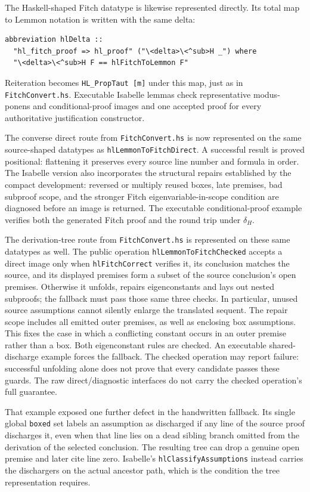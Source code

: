 \documentclass[11pt]{article}
\theoremstyle{plain}
\theoremstyle{definition}
\theoremstyle{remark}
\begin{document}
The Haskell-shaped Fitch datatype is likewise represented directly. Its total
map to Lemmon notation is written with the same delta:

\begin{lstlisting}[language={}]
abbreviation hlDelta ::
  "hl_fitch_proof => hl_proof" ("\<delta>\<^sub>H _") where
  "\<delta>\<^sub>H F == hlFitchToLemmon F"
\end{lstlisting}

\noindent Reiteration becomes \verb|HL_PropTaut [m]| under this map, just as
in \verb|FitchConvert.hs|. Executable Isabelle lemmas check representative
modus-ponens and conditional-proof images and one accepted proof for every
authoritative justification constructor.

The converse direct route from \verb|FitchConvert.hs| is now represented on
the same source-shaped datatypes as \verb|hlLemmonToFitchDirect|.  A successful
result is proved positional: flattening it preserves every source line number
and formula in order.  The Isabelle version also incorporates the structural
repairs established by the compact development: reversed or multiply reused
boxes, late premises, bad subproof scope, and the stronger Fitch
eigenvariable-in-scope condition are diagnosed before an image is returned.
The executable conditional-proof example verifies both the generated Fitch
proof and the round trip under $\delta_H$.

The derivation-tree route from \verb|FitchConvert.hs| is represented on these
same datatypes as well.  The public operation
\verb|hlLemmonToFitchChecked| accepts a direct image only when
\verb|hlFitchCorrect| verifies it, its conclusion matches the source, and its
displayed premises form a subset of the source conclusion's open premises.
Otherwise it unfolds, repairs eigenconstants and lays out nested subproofs;
the fallback must pass those same three checks. In particular, unused source
assumptions cannot silently enlarge the translated sequent.
The repair scope includes all emitted outer premises, as well as enclosing
box assumptions. This fixes the case in which a conflicting constant occurs
in an outer premise rather than a box. Both eigenconstant rules are checked.
An executable shared-discharge example forces the fallback. The checked
operation may report failure: successful unfolding alone does not prove that
every candidate passes these guards. The raw direct/diagnostic interfaces do
not carry the checked operation's full guarantee.

That example exposed one further defect in the handwritten fallback.  Its
single global \verb|boxed| set labels an assumption as discharged if any line
of the source proof discharges it, even when that line lies on a dead sibling
branch omitted from the derivation of the selected conclusion.  The resulting
tree can drop a genuine open premise and later cite line zero.  Isabelle's
\verb|hlClassifyAssumptions| instead carries the dischargers on the actual
ancestor path, which is the condition the tree representation requires.
\end{document}
